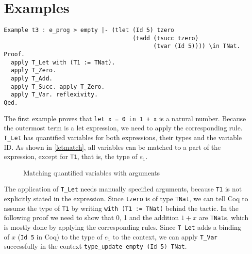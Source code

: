 \documentclass[fleqn]{scrreprt}
\newcommand{\coqinline}[1]{\texttt{#1}}
\begin{document}
\section{Examples}
\begin{verbatim}
Example t3 : e_prog > empty |- (tlet (Id 5) tzero 
                                     (tadd (tsucc tzero) 
                                           (tvar (Id 5)))) \in TNat.
Proof. 
  apply T_Let with (T1 := TNat).
  apply T_Zero.
  apply T_Add.
  apply T_Succ. apply T_Zero.
  apply T_Var. reflexivity.
Qed.
\end{verbatim}
The first example proves that \texttt{let x = 0 in 1 + x} is a natural number. Because the outermost term is a let expression, we need to apply the corresponding rule. \coqinline{T_Let} has quantified variables for both expressions, their types and the variable ID. As shown in \autoref{letmatch}, all variables can be matched to a part of the expression, except for \coqinline{T1}, that is, the type of $e_{1}$.
\begin{figure}[H]
	\caption{Matching quantified variables with arguments}
	\label{letmatch}
\end{figure}
The application of \coqinline{T_Let} needs manually specified arguments, because \coqinline{T1} is not explicitly stated in the expression. Since \coqinline{tzero} is of type \coqinline{TNat}, we can tell Coq to assume the type of \coqinline{T1} by writing \coqinline{with (T1 := TNat)} behind the tactic. In the following proof we need to show that 0, 1 and the addition $1 + x$ are \coqinline{TNat}s, which is mostly done by applying the corresponding rules. Since \coqinline{T_Let} adds a binding of $x$ (\coqinline{Id 5} in Coq) to the type of $e_{1}$ to the context, we can apply \coqinline{T_Var} successfully in the context \coqinline{type_update empty (Id 5) TNat}.\\
\par 
\end{document}
